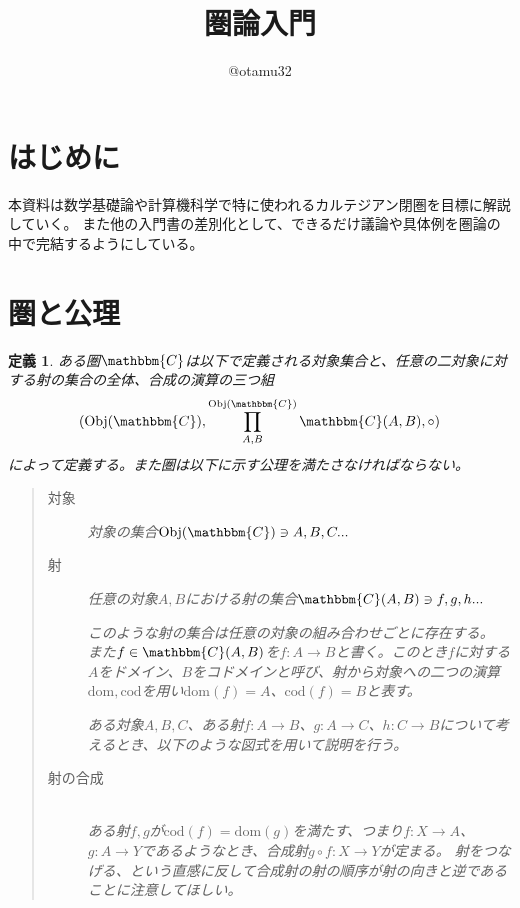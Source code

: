 \documentclass[uplatex,dvipdfmx]{jsarticle}
\newcommand{\cat}[1]{\mathbbm{#1}}
\newcommand{\arrow}{\rightarrow}
\newcommand{\obj}[1]{\mathrm{Obj}(\cat{#1})}
\newcommand{\mor}[3]{#1:#2\arrow #3}
\newcommand{\dom}{\mathrm{dom}}
\newcommand{\cod}{\mathrm{cod}}
\newcommand{\arset}[3]{\cat{#1}(#2,#3)}
\newtheorem{define}{定義}[section]
\numberwithin{proof}{subsection}
\numberwithin{prop}{subsection}
\numberwithin{define}{subsection}
\begin{document}
	\title{圏論入門}
  \author{@otamu32}
	\maketitle
	\tableofcontents
	\section{はじめに}
	本資料は数学基礎論や計算機科学で特に使われるカルテジアン閉圏を目標に解説していく。
	また他の入門書の差別化として、できるだけ議論や具体例を圏論の中で完結するようにしている。

	\section{圏と公理}
	\begin{define}
		ある圏$\cat{C}$は以下で定義される対象集合と、任意の二対象に対する射の集合の全体、合成の演算の三つ組\[(\obj{C},\prod\limits_{A,B}^{\obj{C}}\arset{C}{A}{B},\circ)\]によって定義する。また圏は以下に示す公理を満たさなければならない。
		\begin{quote}
			\begin{description}
			\item[対象] 対象の集合$\obj{C}\ni A,B,C...$
			\item[射] 任意の対象$A,B$における射の集合$\arset{C}{A}{B}\ni f,g,h...$

			このような射の集合は任意の対象の組み合わせごとに存在する。
			また$f\in\arset{C}{A}{B}$を$\mor{f}{A}{B}$と書く。このとき$f$に対する$A$をドメイン、$B$をコドメインと呼び、射から対象への二つの演算$\dom,\cod$を用い$\dom(f)=A$、$\cod(f)=B$と表す。

			ある対象$A,B,C$、ある射$\mor{f}{A}{B}$、$\mor{g}{A}{C}$、$\mor{h}{C}{B}$について考えるとき、以下のような図式を用いて説明を行う。
			\begin{center}
			\end{center}

			\item[射の合成]~\\ ある射$f,g$が$\cod(f)=\dom(g)$を満たす、つまり$\mor{f}{X}{A}$、$\mor{g}{A}{Y}$であるようなとき、合成射$\mor{g\circ f}{X}{Y}$が定まる。
			射をつなげる、という直感に反して合成射の射の順序が射の向きと逆であることに注意してほしい。


\end{description}
\end{quote}
\end{define}
\end{document}
